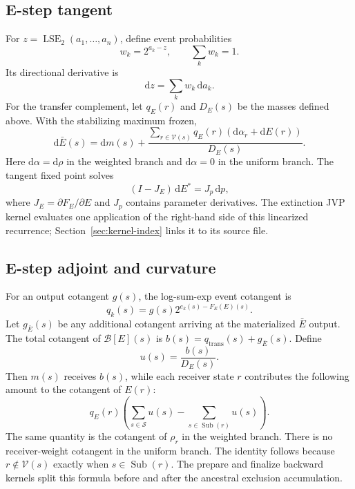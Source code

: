 \documentclass[11pt]{article}
\newcommand{\LSE}{\operatorname{LSE}_2}
\newcommand{\Sub}{\operatorname{Sub}}
\newcommand{\dd}{\mathrm{d}}
\begin{document}
\subsection{E-step tangent}

For $z=\LSE(a_1,\ldots,a_n)$, define event probabilities
\begin{equation}
  w_k=2^{a_k-z}, \qquad \sum_k w_k=1.
  \label{eq:lse-weights}
\end{equation}
Its directional derivative is
\begin{equation}
  \dd z=\sum_k w_k\,\dd a_k.
  \label{eq:lse-jvp}
\end{equation}
For the transfer complement, let $q_E(r)$ and $D_E(s)$ be the masses defined
above.  With the stabilizing maximum frozen,
\begin{equation}
  \dd\bar E(s)
  =\dd m(s)
   +\frac{
     \sum_{r\in\mathcal V(s)}q_E(r)
       (\dd\alpha_r+\dd E(r))
   }{D_E(s)}.
  \label{eq:ebar-jvp}
\end{equation}
Here $\dd\alpha=\dd\rho$ in the weighted branch and $\dd\alpha=0$ in the
uniform branch.
The tangent fixed point solves
\begin{equation}
  (I-J_E)\,\dd E^*=J_p\,\dd p,
  \label{eq:e-tangent-fixed-point}
\end{equation}
where $J_E=\partial F_E/\partial E$ and $J_p$ contains parameter
derivatives.  The extinction JVP kernel evaluates one application of the
right-hand side of this linearized recurrence; Section~\ref{sec:kernel-index}
links it to its source file.

\subsection{E-step adjoint and curvature}

For an output cotangent $g(s)$, the log-sum-exp event cotangent is
\begin{equation}
  q_k(s)=g(s)2^{e_k(s)-F_E(E)(s)}.
  \label{eq:e-adjoint-event}
\end{equation}
Let $g_{\bar E}(s)$ be any additional cotangent arriving at the materialized
$\bar E$ output.  The total cotangent of $\mathcal B[E](s)$ is
$b(s)=q_{\mathrm{trans}}(s)+g_{\bar E}(s)$.  Define
\begin{equation}
  u(s)=\frac{b(s)}{D_E(s)}.
\end{equation}
Then $m(s)$ receives $b(s)$, while each receiver state $r$ contributes the
following amount to the cotangent of $E(r)$:
\begin{equation}
  q_E(r)\left(
    \sum_{s\in\mathcal S}u(s)-\sum_{s\in\Sub(r)}u(s)
  \right).
  \label{eq:complement-vjp}
\end{equation}
The same quantity is the cotangent of $\rho_r$ in the weighted branch.  There
is no receiver-weight cotangent in the uniform branch.  The identity follows
because $r\notin\mathcal V(s)$ exactly when $s\in\Sub(r)$.
The prepare and finalize backward kernels split this formula before and after
the ancestral exclusion accumulation.
\end{document}
